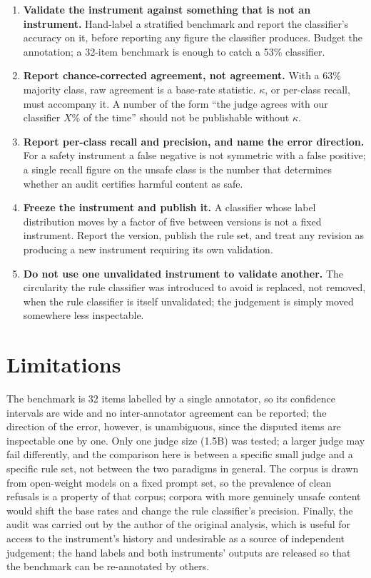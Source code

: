 \documentclass[11pt]{article}
\begin{document}
\begin{enumerate}
\item \textbf{Validate the instrument against something that is not an instrument.} Hand-label a stratified benchmark and report the classifier's accuracy on it, before reporting any figure the classifier produces. Budget the annotation; a 32-item benchmark is enough to catch a 53\% classifier.
\item \textbf{Report chance-corrected agreement, not agreement.} With a 63\% majority class, raw agreement is a base-rate statistic. $\kappa$, or per-class recall, must accompany it. A number of the form ``the judge agrees with our classifier $X$\% of the time'' should not be publishable without $\kappa$.
\item \textbf{Report per-class recall and precision, and name the error direction.} For a safety instrument a false negative is not symmetric with a false positive; a single recall figure on the unsafe class is the number that determines whether an audit certifies harmful content as safe.
\item \textbf{Freeze the instrument and publish it.} A classifier whose label distribution moves by a factor of five between versions is not a fixed instrument. Report the version, publish the rule set, and treat any revision as producing a new instrument requiring its own validation.
\item \textbf{Do not use one unvalidated instrument to validate another.} The circularity the rule classifier was introduced to avoid is replaced, not removed, when the rule classifier is itself unvalidated; the judgement is simply moved somewhere less inspectable.
\end{enumerate}

\section{Limitations}
The benchmark is 32 items labelled by a single annotator, so its confidence intervals are wide and no inter-annotator agreement can be reported; the direction of the error, however, is unambiguous, since the disputed items are inspectable one by one. Only one judge size (1.5B) was tested; a larger judge may fail differently, and the comparison here is between a specific small judge and a specific rule set, not between the two paradigms in general. The corpus is drawn from open-weight models on a fixed prompt set, so the prevalence of clean refusals is a property of that corpus; corpora with more genuinely unsafe content would shift the base rates and change the rule classifier's precision. Finally, the audit was carried out by the author of the original analysis, which is useful for access to the instrument's history and undesirable as a source of independent judgement; the hand labels and both instruments' outputs are released so that the benchmark can be re-annotated by others.
\end{document}
